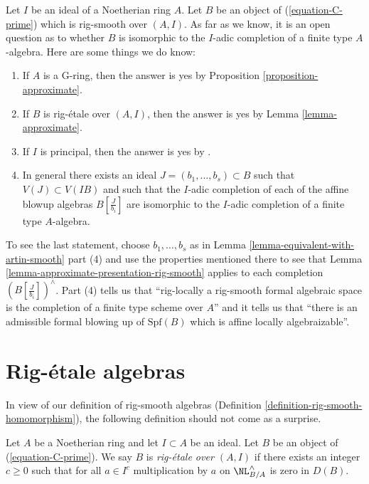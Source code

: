 \begin{remark}
\label{remark-discussion}
Let $I$ be an ideal of a Noetherian ring $A$. Let $B$ be an object
of (\ref{equation-C-prime}) which is rig-smooth over $(A, I)$.
As far as we know, it is an open question as to whether $B$
is isomorphic to the $I$-adic completion of a finite type $A$-algebra.
Here are some things we do know:
\begin{enumerate}
\item If $A$ is a G-ring, then the answer is yes by
Proposition \ref{proposition-approximate}.
\item If $B$ is rig-\'etale over $(A, I)$, then the answer is
yes by Lemma \ref{lemma-approximate}.
\item If $I$ is principal, then the answer is yes by
\cite[III Theorem 7]{Elkik}.
\item In general there exists an ideal $J = (b_1, \ldots, b_s) \subset B$
such that $V(J) \subset V(IB)$ and such that the $I$-adic completion of
each of the affine blowup algebras $B[\frac{J}{b_i}]$ are isomorphic
to the $I$-adic completion of a finite type $A$-algebra.
\end{enumerate}
To see the last statement, choose $b_1, \ldots, b_s$ as in
Lemma \ref{lemma-equivalent-with-artin-smooth} part (4)
and use the properties mentioned there to see that
Lemma \ref{lemma-approximate-presentation-rig-smooth}
applies to each completion $(B[\frac{J}{b_i}])^\wedge$.
Part (4) tells us that ``rig-locally a rig-smooth formal algebraic space is
the completion of a finite type scheme over $A$'' and it tells us that
``there is an admissible formal blowing up of $\text{Spf}(B)$
which is affine locally algebraizable''.
\end{remark}







\section{Rig-\'etale algebras}
\label{section-rig-etale}

\noindent
In view of our definition of rig-smooth algebras
(Definition \ref{definition-rig-smooth-homomorphism}),
the following definition should not come as a surprise.

\begin{definition}
\label{definition-rig-etale-homomorphism}
Let $A$ be a Noetherian ring and let $I \subset A$ be an ideal.
Let $B$ be an object of (\ref{equation-C-prime}). We say
$B$ is {\it rig-\'etale over $(A, I)$} if there exists an integer
$c \geq 0$ such that for all $a \in I^c$
multiplication by $a$ on $\NL_{B/A}^\wedge$
is zero in $D(B)$.
\end{definition}

